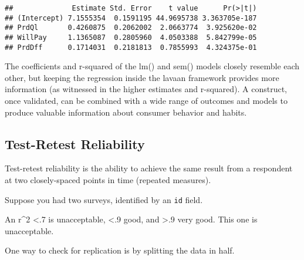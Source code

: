 \documentclass[
]{book}
\newenvironment{Shaded}{\begin{snugshade}}{\end{snugshade}}
\newcommand{\CommentTok}[1]{\textcolor[rgb]{0.56,0.35,0.01}{\textit{#1}}}
\theoremstyle{definition}
\theoremstyle{definition}
\theoremstyle{definition}
\theoremstyle{definition}
\theoremstyle{remark}
\begin{document}
\begin{verbatim}
##              Estimate Std. Error    t value      Pr(>|t|)
## (Intercept) 7.1555354  0.1591195 44.9695738 3.363705e-187
## PrdQl       0.4260875  0.2062002  2.0663774  3.925620e-02
## WillPay     1.1365087  0.2805960  4.0503388  5.842799e-05
## PrdDff      0.1714031  0.2181813  0.7855993  4.324375e-01
\end{verbatim}

The coefficients and r-squared of the lm() and sem() models closely resemble each other, but keeping the regression inside the lavaan framework provides more information (as witnessed in the higher estimates and r-squared). A construct, once validated, can be combined with a wide range of outcomes and models to produce valuable information about consumer behavior and habits.

\hypertarget{test-retest-reliability}{%
\subsection{Test-Retest Reliability}\label{test-retest-reliability}}

Test-retest reliability is the ability to achieve the same result from a respondent at two closely-spaced points in time (repeated measures).

Suppose you had two surveys, identified by an \texttt{id} field.

\begin{Shaded}
\end{Shaded}

An r\^{}2 \textless.7 is unacceptable, \textless.9 good, and \textgreater.9 very good. This one is unacceptable.

One way to check for replication is by splitting the data in half.

\begin{Shaded}
\end{Shaded}
\end{document}
